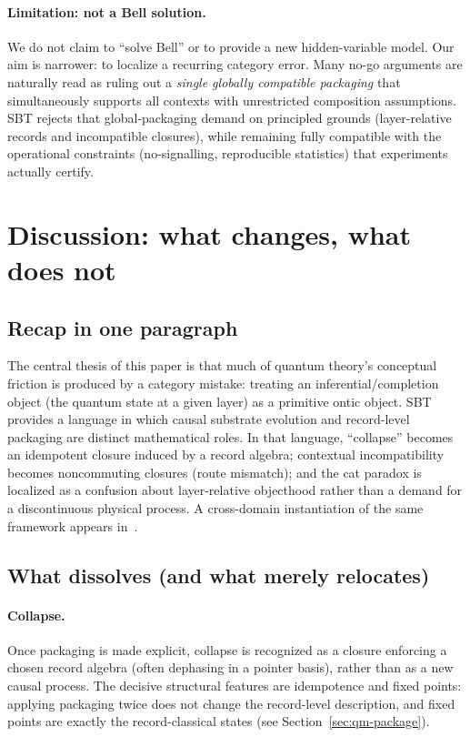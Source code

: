 \documentclass[11pt]{article}
\begin{document}
\paragraph{Limitation: not a Bell solution.}
We do not claim to ``solve Bell'' or to provide a new hidden-variable model.
Our aim is narrower: to localize a recurring category error.
Many no-go arguments are naturally read as ruling out a \emph{single globally compatible packaging} that simultaneously supports all contexts with unrestricted composition assumptions.
SBT rejects that global-packaging demand on principled grounds (layer-relative records and incompatible closures), while remaining fully compatible with the operational constraints (no-signalling, reproducible statistics) that experiments actually certify.
 \section{Discussion: what changes, what does not}\label{sec:discussion}

\subsection{Recap in one paragraph}

The central thesis of this paper is that much of quantum theory's conceptual friction is produced by a category mistake: treating an inferential/completion object (the quantum state at a given layer) as a primitive ontic object.
SBT provides a language in which causal substrate evolution and record-level packaging are distinct mathematical roles.
In that language, ``collapse'' becomes an idempotent closure induced by a record algebra; contextual incompatibility becomes noncommuting closures (route mismatch); and the cat paradox is localized as a confusion about layer-relative objecthood rather than a demand for a discontinuous physical process. A cross-domain instantiation of the same framework appears in~\cite{Tsiokos2026Stone}.

\subsection{What dissolves (and what merely relocates)}

\paragraph{Collapse.}
Once packaging is made explicit, collapse is recognized as a closure enforcing a chosen record algebra (often dephasing in a pointer basis), rather than as a new causal process.
The decisive structural features are idempotence and fixed points: applying packaging twice does not change the record-level description, and fixed points are exactly the record-classical states (see Section~\ref{sec:qm-package}).
\end{document}
